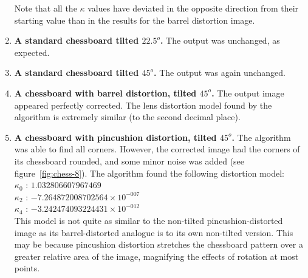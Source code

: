 \begin{enumerate}
   Note that all the $\kappa$ values have deviated in the opposite direction from their starting value than in the results for the barrel distortion image.
  \item \textbf{A standard chessboard tilted $22.5^o$.} The output was unchanged, as expected.
  \item \textbf{A standard chessboard tilted $45^o$.} The output was again unchanged.
  \item \textbf{A chessboard with barrel distortion, tilted $45^o$.} The output image appeared perfectly corrected. The lens distortion model found by the algorithm is extremely similar (to the second decimal place).
  \item \textbf{A chessboard with pincushion distortion, tilted $45^o$.} The algorithm was able to find all corners. However, the corrected image had the corners of its chessboard rounded, and some minor noise was added (see figure~\ref{fig:chess-8}). The algorithm found the following distortion model:\\
   $ \kappa_{0}$ : $1.032806607967469$\\
   $ \kappa_{2}$ : $-7.264872008702564 \times 10^{-007}$\\
   $ \kappa_{4}$ : $-3.242474093224431 \times 10^{-012}$\\
   This model is not quite as similar to the non-tilted pincushion-distorted image as its barrel-distorted analogue is to its own non-tilted version. This may be because pincushion distortion stretches the chessboard pattern over a greater relative area of the image, magnifying the effects of rotation at most points.
\begin{figure}[H]
  \centering

\end{figure}
\end{enumerate}
